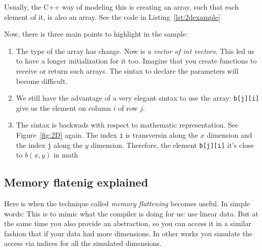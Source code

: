 Usually, the C++ way of modeling this is creating an array, such that each element of it, is also an array. See the code in Listing~\ref{lst:2dexample}

{\centering
\begin{minipage}{\linewidth}
\end{minipage}
\par
}
\vspace{0.5cm}
Now, there is three main points to highlight in the sample:
\begin{enumerate}

\item The type of the array has change.
      Now is \emph{a vector of int vectors}.
      This led us to have a longer initialization for it too.
      Imagine that you create functions to receive or return such arrays.
      The sintax to declare the parameters will become difficult.

\item We still have the advantage of a very elegant sintax to use the array: \texttt{b[j][i]} give us the element on column $i$ of row $j$.

\item The sintax is backwads with respect to mathematic representation.
      See Figure~\ref{fig:2D} again.
      The index \texttt{i} is transversin along the $x$ dimension and the index \texttt{j} along the $y$ dimension.
      Therefore, the element \texttt{b[j][i]} it's close to $b(x, y)$ in math
 \end{enumerate}

\subsection{Memory flatenig explained}

Here is when the technique called \emph{memory flattening} becomes useful.
In simple words: This is to mimic what the compiler is doing for us: use linear data.
But at the same time you also provide an abstraction, so you can access it in a similar fashion that if your data had more dimensions.
In other works you simulate the access via indices for all the simulated dimensions.

